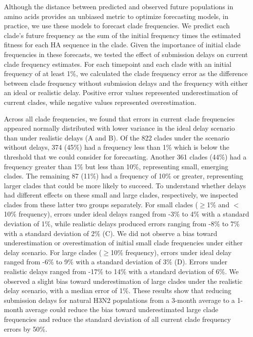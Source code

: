 \documentclass[9pt,lineno]{elife}
\begin{document}
Although the distance between predicted and observed future populations in amino acids provides an unbiased metric to optimize forecasting models, in practice, we use these models to forecast clade frequencies.
We predict each clade's future frequency as the sum of the initial frequency times the estimated fitness for each HA sequence in the clade.
Given the importance of initial clade frequencies in these forecasts, we tested the effect of submission delays on current clade frequency estimates.
For each timepoint and each clade with an initial frequency of at least 1\%, we calculated the clade frequency error as the difference between clade frequency without submission delays and the frequency with either an ideal or realistic delay.
Positive error values represented underestimation of current clades, while negative values represented overestimation.

Across all clade frequencies, we found that errors in current clade frequencies appeared normally distributed with lower variance in the ideal delay scenario than under realistic delays (A and B).
Of the 822 clades under the scenario without delays, 374 (45\%) had a frequency less than 1\% which is below the threshold that we could consider for forecasting.
Another 361 clades (44\%) had a frequency greater than 1\% but less than 10\%, representing small, emerging clades.
The remaining 87 (11\%) had a frequency of 10\% or greater, representing larger clades that could be more likely to succeed.
To understand whether delays had different effects on these small and large clades, respectively, we inspected clades from these latter two groups separately.
For small clades ($\ge$1\% and $<$10\% frequency), errors under ideal delays ranged from -3\% to 4\% with a standard deviation of 1\%, while realistic delays produced errors ranging from -8\% to 7\% with a standard deviation of 2\% (C).
We did not observe a bias toward underestimation or overestimation of initial small clade frequencies under either delay scenario.
For large clades ($\ge$10\% frequency), errors under ideal delay ranged from -6\% to 9\% with a standard deviation of 3\% (D).
Errors under realistic delays ranged from -17\% to 14\% with a standard deviation of 6\%.
We observed a slight bias toward underestimation of large clades under the realistic delay scenario, with a median error of 1\%.
These results show that reducing submission delays for natural H3N2 populations from a 3-month average to a 1-month average could reduce the bias toward underestimated large clade frequencies and reduce the standard deviation of all current clade frequency errors by 50\%.
\end{document}
